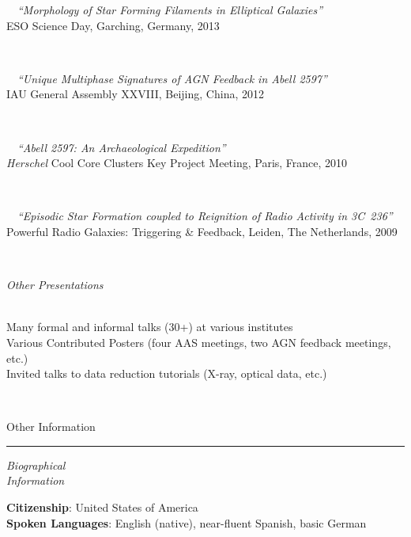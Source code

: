 \documentclass[11pt]{article}
\makeatletter
\def\vhrulefill#1{\leavevmode\leaders\hrule\@height#1\hfill \kern\z@}
\makeatother
\begin{document}
\hspace{42mm} \parbox{5.15in}{
\textbullet~~{\it ``Morphology of Star Forming Filaments in Elliptical Galaxies''} \\ ESO Science Day, Garching, Germany, 2013}\\

\hspace{42mm} \parbox{5.15in}{
\textbullet~~{\it ``Unique Multiphase Signatures of AGN Feedback in Abell 2597''} \\ IAU General Assembly XXVIII, Beijing, China, 2012 } \\

\hspace{42mm} \parbox{5.15in}{
\textbullet~~{\it ``Abell 2597: An Archaeological Expedition''} \\ {\it Herschel} Cool Core Clusters Key Project Meeting, Paris, France, 2010 } \\

\hspace{42mm} \parbox{5.15in}{
\textbullet~~{\it ``Episodic Star Formation coupled to Reignition of Radio Activity in 3C~236''} \\ 
Powerful Radio Galaxies: Triggering \& Feedback, Leiden, The Netherlands, 2009 } \\


\vspace{4mm}

\hspace{2.5mm} \parbox{1.5in}{{\it Other Presentations \\\\}} \parbox{5.15in}{
Many formal and informal talks (30+) at various institutes\\
Various Contributed Posters (four AAS meetings, two AGN feedback meetings, etc.)\\
Invited talks to data reduction tutorials (X-ray, optical data, etc.)
}\\


\vspace{4mm}

{\sc Other Information} \vhrulefill{0.4pt}

\vspace{4mm}


\hspace{2.5mm} \parbox{1.5in}{{\it Biographical \\ Information  }} \parbox{5.15in}{
{\bf Citizenship}: United States of America\\
{\bf Spoken Languages}: English (native), near-fluent Spanish, basic German}\\
\end{document}

